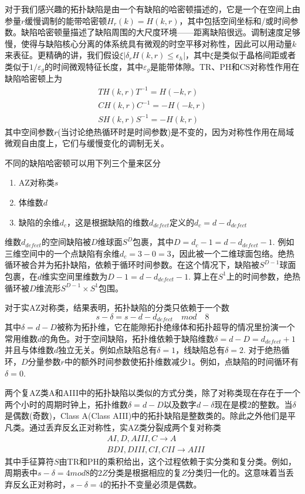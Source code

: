 \documentclass{article}
\numberwithin{equation}{subsection}
\begin{document}
对于我们感兴趣的拓扑缺陷是由一个有缺陷的哈密顿描述的，它是一个在空间上由参量$r$缓慢调制的能带哈密顿$H_{r}(k)=H(k,r)$，其中包括空间坐标和/或时间参数。缺陷哈密顿量描述了缺陷周围的大尺度环境——距离缺陷很远。调制速度足够慢，使得与缺陷核心分离的体系统具有微观的时空平移对称性，因此可以用动量$k$来表征。更精确的讲，我们假设$\xi|\delta_rH(k,r)\leq \epsilon_h|$，其中$\xi$是类似于晶格间距或者类似于$1/\varepsilon_g$的时间微观特征长度，其中$\varepsilon_g$是能带体隙。TR、PH和CS对称性作用在缺陷哈密顿上为
\begin{equation}
    \begin{split}
        TH(k,r)T^{-1}=H(-k,r)\\
        CH(k,r)C^{-1}=-H(-k,r)\\
        SH(k,r)S^{-1}=-H(k,r)
    \end{split}
\end{equation}
其中空间参数$r$(当讨论绝热循环时是时间参数)是不变的，因为对称性作用在局域微观自由度上，它们与缓慢变化的调制无关。

不同的缺陷哈密顿可以用下列三个量来区分
\begin{enumerate}
    \item AZ对称类$s$
    \item 体维数$d$
    \item 缺陷的余维$d_c$，这是根据缺陷的维数$d_{defect}$定义的$d_c=d-d_{defect}$
\end{enumerate}
维数$d_{defect}$的空间缺陷被$D$维球面$S^{D}$包裹，其中$D=d_c-1=d-d_{defect}-1$. 例如三维空间中的一个点缺陷有余维$d_c=3-0=3$，因此被一个二维球面包络。绝热循环被合并为拓扑缺陷，依赖于循环时间参数。在这个情况下，缺陷被$S^{D-1}$球面包裹，在$d$维实空间里维数为$D-1=d-d_{defect}-1$. 算上在$S^1$上的时间参数，绝热循环被$D$维流形$S^{D-1}\times S^1$包围。

对于实AZ对称类，结果表明，拓扑缺陷的分类只依赖于一个数
\begin{equation}
    s-\delta=s-d-d_{defect}\quad mod\quad 8
\end{equation}
其中$\delta=d-D$被称为拓扑维，它在能隙拓扑绝缘体和拓扑超导的情况里扮演一个常用维数$d$的角色。对于空间缺陷，拓扑维依赖于缺陷维数$\delta=d-D=d_{defect}+1$并且与体维数$d$独立无关。例如点缺陷总有$\delta=1$，线缺陷总有$\delta=2$. 对于绝热循环，$D$分量参数$r$中的额外时间参数使拓扑维数减少1。例如，点缺陷的时间循环有$\delta=0$. 

两个复AZ类A和AIII中的拓扑缺陷以类似的方式分类，除了对称类现在存在于一个两个小时的周期时钟上，拓扑维数$\delta=d−D$以及数字$d−\delta$现在是模$2$的整数。当$\delta$是偶数(奇数)，Class A(Class AIII)中的拓扑缺陷是整数类的。除此之外他们是平凡类。通过丢弃反幺正对称性，实AZ类分裂成两个复对称类
\begin{equation}
    \begin{split}
        &AI,D,AIII,C\rightarrow A\\
        &BDI,DIII,CI,CII\rightarrow AIII
    \end{split}
\end{equation}
其中手征算符$S$由TR和PH的乘积给出，这个过程依赖于实分类和复分类。例如，周期表中$s-\delta=4mod8$的$2Z$分类是根据相应的复$Z$分类归一化的。这意味着当丢弃反幺正对称时，$s−\delta=4$的拓扑不变量必须是偶数。
\end{document}

